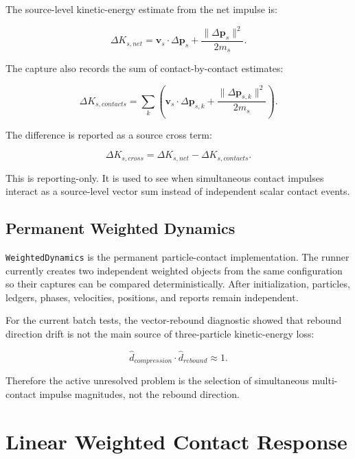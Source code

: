 The source-level kinetic-energy estimate from the net impulse is:

\begin{equation}
\Delta K_{s,net}
=
\mathbf{v}_s \cdot \Delta \mathbf{p}_s
+
\frac{\lVert \Delta \mathbf{p}_s \rVert^2}{2m_s}.
\end{equation}

The capture also records the sum of contact-by-contact estimates:

\begin{equation}
\Delta K_{s,contacts}
=
\sum_k
\left(
\mathbf{v}_s \cdot \Delta \mathbf{p}_{s,k}
+
\frac{\lVert \Delta \mathbf{p}_{s,k} \rVert^2}{2m_s}
\right).
\end{equation}

The difference is reported as a source cross term:

\begin{equation}
\Delta K_{s,cross}
=
\Delta K_{s,net} - \Delta K_{s,contacts}.
\end{equation}

This is reporting-only.  It is used to see when simultaneous contact impulses
interact as a source-level vector sum instead of independent scalar contact
events.

\subsection{Permanent Weighted Dynamics}

\texttt{WeightedDynamics} is the permanent particle-contact implementation.
The runner currently creates two independent weighted objects from the same
configuration so their captures can be compared deterministically.  After
initialization, particles, ledgers, phases, velocities, positions, and reports
remain independent.

For the current batch tests, the vector-rebound diagnostic showed that rebound
direction drift is not the main source of three-particle kinetic-energy loss:

\begin{equation}
\hat{d}_{compression}\cdot\hat{d}_{rebound} \approx 1.
\end{equation}

Therefore the active unresolved problem is the selection of simultaneous
multi-contact impulse magnitudes, not the rebound direction.

\section{Linear Weighted Contact Response}
\label{sec:linear-shadow-contact-response}

